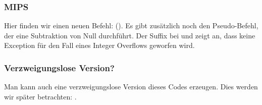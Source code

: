 \subsubsection{MIPS}



Hier finden wir einen neuen Befehl:  ().
Es gibt zusätzlich noch den  Pseudo-Befehl, der eine Subtraktion von Null durchführt. Der Suffix  bei
 und  zeigt an, dass keine Exception für den Fall eines Integer Overflows geworfen wird.

\subsubsection{Verzweigungslose Version?}
Man kann auch eine verzweigungslose Version dieses Codes erzeugen. Dies werden wir später betrachten:
. 
